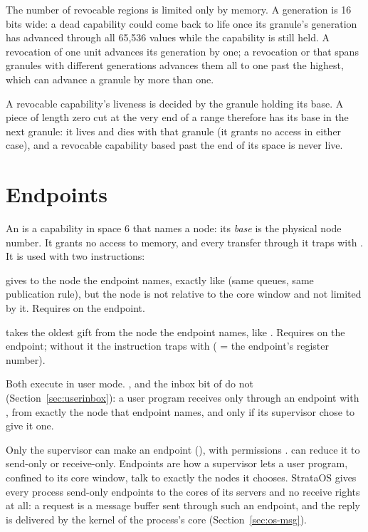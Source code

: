 The number of revocable regions is limited only by memory. A generation is 16 bits wide: a dead
capability could come back to life once its granule's generation has advanced through all 65,536
values while the capability is still held. A revocation of one unit advances its generation by one; a
revocation or  that spans granules with different generations advances them all to one
past the highest, which can advance a granule by more than one.

A revocable capability's liveness is decided by the granule holding its base. A piece of length zero
cut at the very end of a range therefore has its base in the next granule: it lives and dies with
that granule (it grants no access in either case), and a revocable capability based past the end of
its space is never live.

\section{Endpoints}\label{sec:endpoints}

An  is a capability in space 6 that names a node: its \textit{base} is the physical node
number. It grants no access to memory, and every transfer through it traps with . It is used
with two instructions:

\begin{description}[leftmargin=1em,style=nextline]
\item[\insref{csend} \texttt{cs, ce}] gives  to the node the endpoint names, exactly like
   (same queues, same publication rule), but the node is not relative to the core window
  and not limited by it. Requires  on the endpoint.
\item[\insref{crecv} \texttt{cd, ce}] takes the oldest gift from the node the endpoint names, like
  . Requires  on the endpoint; without it the instruction traps with
   ( = the endpoint's register number).
\end{description}

Both execute in user mode. ,  and the inbox bit of  do not
(Section~\ref{sec:userinbox}): a user program receives only through an endpoint with , from
exactly the node that endpoint names, and only if its supervisor chose to give it one.

Only the supervisor can make an endpoint (), with permissions .
 can reduce it to send-only or receive-only. Endpoints are how a supervisor lets a user
program, confined to its core window, talk to exactly the nodes it chooses. StrataOS gives every
process send-only endpoints to the cores of its servers and no receive rights at all: a request is a
message buffer sent through such an endpoint, and the reply is delivered by the kernel of the
process's core (Section~\ref{sec:os-msg}).

